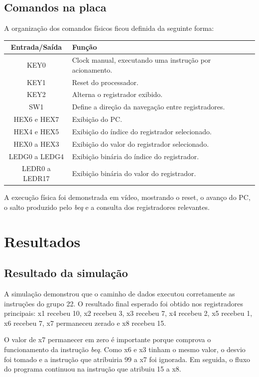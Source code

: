 \documentclass[12pt,a4paper]{article}
\begin{document}
\subsection{Comandos na placa}

A organização dos comandos físicos ficou definida da seguinte forma:

\begin{center}
\begin{tabular}{c l}
\toprule
\textbf{Entrada/Saída} & \textbf{Função} \\
\midrule
KEY0 & Clock manual, executando uma instrução por acionamento. \\
KEY1 & Reset do processador. \\
KEY2 & Alterna o registrador exibido. \\
SW1 & Define a direção da navegação entre registradores. \\
HEX6 e HEX7 & Exibição do PC. \\
HEX4 e HEX5 & Exibição do índice do registrador selecionado. \\
HEX0 a HEX3 & Exibição do valor do registrador selecionado. \\
LEDG0 a LEDG4 & Exibição binária do índice do registrador. \\
LEDR0 a LEDR17 & Exibição binária do valor do registrador. \\
\bottomrule
\end{tabular}
\end{center}

A execução física foi demonstrada em vídeo, mostrando o reset, o avanço do PC, o salto produzido pelo \textit{beq} e a consulta dos registradores relevantes.

\section{Resultados}

\subsection{Resultado da simulação}

A simulação demonstrou que o caminho de dados executou corretamente as instruções do grupo 22. O resultado final esperado foi obtido nos registradores principais: x1 recebeu 10, x2 recebeu 3, x3 recebeu 7, x4 recebeu 2, x5 recebeu 1, x6 recebeu 7, x7 permaneceu zerado e x8 recebeu 15.

O valor de x7 permanecer em zero é importante porque comprova o funcionamento da instrução \textit{beq}. Como x6 e x3 tinham o mesmo valor, o desvio foi tomado e a instrução que atribuiria 99 a x7 foi ignorada. Em seguida, o fluxo do programa continuou na instrução que atribuiu 15 a x8.
\end{document}
